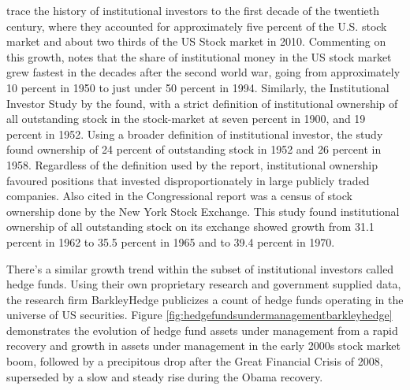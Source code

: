 \cite{Blume2012} trace the history of institutional investors to the first decade of the twentieth century, where they accounted for approximately five percent of the U.S. stock market and about two thirds of the US Stock market in 2010.  Commenting on this growth, \cite{friedmaneconomic1996} notes that the share of institutional money in the US stock market grew fastest in the decades after the second world war, going from approximately 10 percent in 1950 to just under 50 percent in 1994. Similarly, the Institutional Investor Study by the \cite{U.S.SecuritiesandExchangeCommission1971} found, with a strict definition of institutional ownership of all outstanding stock in the stock-market at seven percent in 1900, and 19 percent in 1952.  Using a broader definition of institutional investor, the study found ownership of 24 percent of outstanding stock in 1952 and 26 percent in 1958.  Regardless of the definition used by the report, institutional ownership favoured positions that invested disproportionately in large publicly traded companies.  Also cited in the Congressional report was a census of stock ownership done by the New York Stock Exchange.  This study found institutional ownership of all outstanding stock on its exchange showed growth from 31.1 percent in 1962 to 35.5 percent in 1965 and to 39.4 percent in 1970. 
	
There's a similar growth trend within the subset of institutional investors called hedge funds.  Using their own proprietary research and government supplied data, the research firm BarkleyHedge publicizes a count of hedge funds operating in the universe of US securities.  Figure \ref{fig:hedgefundsundermanagementbarkleyhedge} demonstrates the evolution of hedge fund assets under management from a rapid recovery and growth in assets under management in the early 2000s stock market boom, followed by a precipitous drop after the Great Financial Crisis of 2008, superseded by a slow and steady rise during the Obama recovery.  

